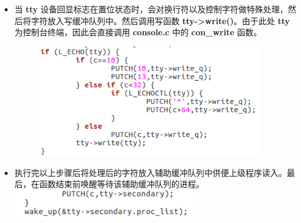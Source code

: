 \begin{enumerate}
\begin{itemize}
\begin{figure}[htbp]
                            \end{figure}
                        \item 当 \textbf{tty} 设备回显标志在置位状态时，会对换行符以及控制字符做特殊处理，然后将字符放入写缓冲队列中。然后调用写函数 \textbf{tty->write()}。由于此处 \textbf{tty} 为控制台终端，因此会直接调用 \textbf{console.c} 中的 \textbf{con\_write} 函数。
                            \begin{figure}[htbp]
                                \hspace*{2.3cm}
                                \includegraphics*[width = 10cm]{s1_3.png}
                            \end{figure}
                        \item 执行完以上步骤后将处理后的字符放入辅助缓冲队列中供便上级程序读入。最后，在函数结束前唤醒等待该辅助缓冲队列的进程。
                            \includegraphics*[width = 8cm]{s1_4.png}


\end{itemize}
\end{enumerate}
